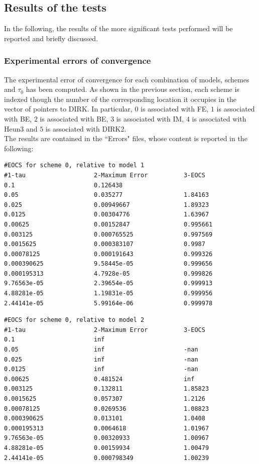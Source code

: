 \documentclass[11pt]{article}
\theoremstyle{theorem}
\theoremstyle{definition}
\begin{document}
\subsection{Results of the tests}
In the following, the results of the more significant tests performed will be reported and briefly discussed.\\

\subsubsection{Experimental errors of convergence}
The experimental error of convergence for each combination of models, schemes and $\tau_0$ has been computed. As shown in the previous section, each scheme is indexed though the number of the corresponding location it occupies in the vector of pointers to DIRK. In particular, $0$ is associated with FE, $1$ is associated with BE, $2$ is associated with BE, $3$ is associated with IM, $4$ is associated with Heun3 and $5$ is associated with DIRK2.\\


 The results are contained in the ``Errors" files, whose content is reported in the following:


\begin{lstlisting}
#EOCS for scheme 0, relative to model 1
#1-tau                   2-Maximum Error          3-EOCS                   
0.1                      0.126438                 	
0.05                     0.035277                 1.84163
0.025                    0.00949667               1.89323
0.0125                   0.00304776               1.63967
0.00625                  0.00152847               0.995661
0.003125                 0.000765525              0.997569
0.0015625                0.000383107              0.9987
0.00078125               0.000191643              0.999326
0.000390625              9.58445e-05              0.999656
0.000195313              4.7928e-05               0.999826
9.76563e-05              2.39654e-05              0.999913
4.88281e-05              1.19831e-05              0.999956
2.44141e-05              5.99164e-06              0.999978
\end{lstlisting}

\begin{lstlisting}
#EOCS for scheme 0, relative to model 2
#1-tau                   2-Maximum Error          3-EOCS                   
0.1                      inf                      	
0.05                     inf                      -nan
0.025                    inf                      -nan
0.0125                   inf                      -nan
0.00625                  0.481524                 inf
0.003125                 0.132811                 1.85823
0.0015625                0.057307                 1.2126
0.00078125               0.0269536                1.08823
0.000390625              0.013101                 1.0408
0.000195313              0.0064618                1.01967
9.76563e-05              0.00320933               1.00967
4.88281e-05              0.00159934               1.00479
2.44141e-05              0.000798349              1.00239
\end{lstlisting}
\end{document}
